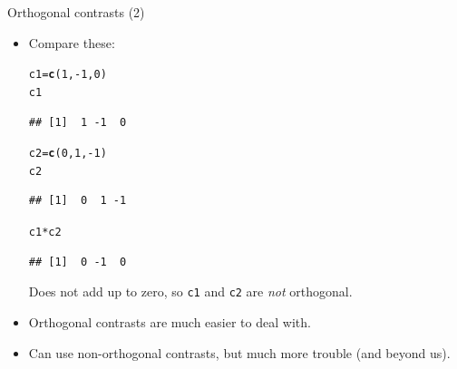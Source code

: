 \documentclass[unknownkeysallowed]{beamer}\usepackage[]{graphicx}\usepackage[]{color}
\makeatletter
\newcommand{\hlnum}[1]{\textcolor[rgb]{0.686,0.059,0.569}{#1}}%
\newcommand{\hlopt}[1]{\textcolor[rgb]{0,0,0}{#1}}%
\newcommand{\hlstd}[1]{\textcolor[rgb]{0.345,0.345,0.345}{#1}}%
\newcommand{\hlkwb}[1]{\textcolor[rgb]{0.69,0.353,0.396}{#1}}%
\newcommand{\hlkwd}[1]{\textcolor[rgb]{0.737,0.353,0.396}{\textbf{#1}}}%
\newenvironment{kframe}{%
 \def\at@end@of@kframe{}%
 \ifinner\ifhmode%
  \def\at@end@of@kframe{\end{minipage}}%
  \begin{minipage}{\columnwidth}%
 \fi\fi%
 \def\FrameCommand##1{\hskip\@totalleftmargin \hskip-\fboxsep
 \colorbox{shadecolor}{##1}\hskip-\fboxsep
     \hskip-\linewidth \hskip-\@totalleftmargin \hskip\columnwidth}%
 \MakeFramed {\advance\hsize-\width
   \@totalleftmargin\z@ \linewidth\hsize
   \@setminipage}}%
 {\par\unskip\endMakeFramed%
 \at@end@of@kframe}
\newenvironment{knitrout}{}{} %
\makeatother
\begin{document}
\begin{frame}[fragile]{Orthogonal contrasts (2)}
  
  \begin{itemize}
\item Compare these:
\begin{knitrout}
\color{fgcolor}\begin{kframe}
\begin{alltt}
\hlstd{c1}\hlkwb{=}\hlkwd{c}\hlstd{(}\hlnum{1}\hlstd{,}\hlopt{-}\hlnum{1}\hlstd{,}\hlnum{0}\hlstd{)}
\hlstd{c1}
\end{alltt}
\begin{verbatim}
## [1]  1 -1  0
\end{verbatim}
\begin{alltt}
\hlstd{c2}\hlkwb{=}\hlkwd{c}\hlstd{(}\hlnum{0}\hlstd{,}\hlnum{1}\hlstd{,}\hlopt{-}\hlnum{1}\hlstd{)}
\hlstd{c2}
\end{alltt}
\begin{verbatim}
## [1]  0  1 -1
\end{verbatim}
\begin{alltt}
\hlstd{c1}\hlopt{*}\hlstd{c2}
\end{alltt}
\begin{verbatim}
## [1]  0 -1  0
\end{verbatim}
\end{kframe}
\end{knitrout}
Does not add up to zero, so \texttt{c1} and \texttt{c2} are \emph{not}
orthogonal.
\item Orthogonal contrasts are much easier to deal with. 

\item Can use non-orthogonal contrasts, but much more trouble (and
  beyond us).
  \end{itemize}
\end{frame}
\end{document}
